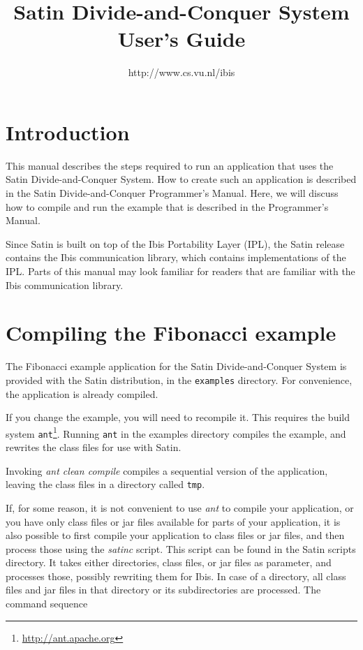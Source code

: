 \documentclass[a4paper,10pt]{article}
\begin{document}
\title{Satin Divide-and-Conquer System User's Guide}

\author{http://www.cs.vu.nl/ibis}

\maketitle

\section{Introduction}

This manual describes the steps required to run an application that
uses the Satin Divide-and-Conquer System. How to create such an application
is described in the Satin Divide-and-Conquer Programmer's Manual.
Here, we will discuss how to compile and run the example that is described
in the Programmer's Manual.

Since Satin is built on top of the Ibis Portability Layer (IPL),
the Satin release contains the Ibis communication library, which contains
implementations of the IPL. Parts of this manual may look familiar for
readers that are familiar with the Ibis communication library.

\section{Compiling the Fibonacci example}

The Fibonacci example application for the Satin Divide-and-Conquer System is
provided with the Satin distribution, in the \texttt{examples} directory.
For convenience, the application is already compiled.

If you change the example, you will need to recompile it. This
requires the build system \texttt{ant}\footnote{\url{http://ant.apache.org}}.
Running \texttt{ant} in the examples directory compiles the example,
and rewrites the class files for use with Satin.

Invoking \emph{ant clean compile} compiles a sequential version
of the application,
leaving the class files in a directory called \texttt{tmp}.

If, for some reason, it is not convenient to use \emph{ant} to compile
your application, or you have only class files or jar files available
for parts of your application, it is also possible to first compile
your application to class files or jar files, and then process those
using the \emph{satinc} script. This script can be found in the Satin
scripts directory. It takes either directories, class files, or jar files
as parameter, and processes those, possibly rewriting them for Ibis.
In case of a directory, all class files and jar files in that directory or
its subdirectories are processed. The command sequence
\end{document}
